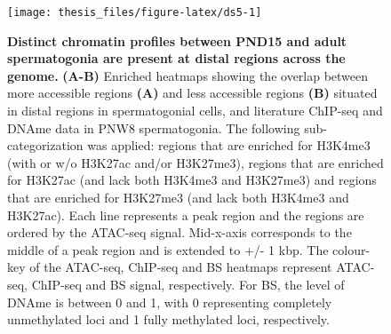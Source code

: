 \documentclass[12pt,twoside]{reedthesis}
\begin{document}
\begin{figure}[htbp]

{\centering \texttt{[image: thesis\_files/figure-latex/ds5-1]} 

}

\caption[Distinct chromatin profiles between PND15 and adult spermatogonia are present at distal regions across the genome]{\textbf{Distinct chromatin profiles between PND15 and adult spermatogonia are present at distal regions across the genome.} \textbf{(A-B)} Enriched heatmaps showing the overlap between more accessible regions \textbf{(A)} and less accessible regions \textbf{(B)} situated in distal regions in spermatogonial cells, and literature ChIP-seq and DNAme data in PNW8 spermatogonia. The following sub-categorization was applied: regions that are enriched for H3K4me3 (with or w/o H3K27ac and/or H3K27me3), regions that are enriched for H3K27ac (and lack both H3K4me3 and H3K27me3) and regions that are enriched for H3K27me3 (and lack both H3K4me3 and H3K27ac). Each line represents a peak region and the regions are ordered by the ATAC-seq signal. Mid-x-axis corresponds to the middle of a peak region and is extended to +/- 1 kbp. The colour-key of the ATAC-seq, ChIP-seq and BS heatmaps represent ATAC-seq, ChIP-seq and BS signal, respectively. For BS, the level of DNAme is between 0 and 1, with 0 representing completely unmethylated loci and 1 fully methylated loci, respectively.}\label{fig:ds5}
\end{figure}
\end{document}
